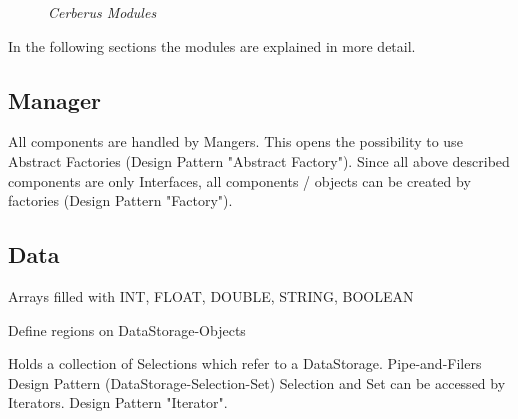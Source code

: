 \begin{figure}[ht]
\centering
{} 
\caption[Cerberus Module Design]{\textit{Cerberus Modules}} 
\label{gfx:cerberus_module_design}
\end{figure}

In the following sections the modules are explained in more detail.

\subsection{Manager}

All components are handled by Mangers. This opens the possibility to use Abstract Factories (Design Pattern "Abstract  Factory"). Since all above described components are only Interfaces, all components / objects can be created by factories (Design Pattern "Factory").

\subsection{Data}

Arrays filled with INT, FLOAT, DOUBLE, STRING, BOOLEAN

Define regions on DataStorage-Objects

Holds a collection of Selections which refer to a DataStorage.
Pipe-and-Filers Design Pattern (DataStorage-Selection-Set)
Selection and Set can be accessed by Iterators. Design Pattern "Iterator".


